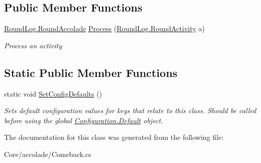 \subsection*{Public Member Functions}
\begin{DoxyCompactItemize}
\item 
\hypertarget{class_m_b_c_1_1_core_1_1mbc_1_1accolade_1_1_comeback_a805182b1fd3ffde85c1e2cb5c56bc25a}{\hyperlink{class_m_b_c_1_1_core_1_1_round_log_a4060830ca7135aa755ec5b6d24aa30e6}{Round\-Log.\-Round\-Accolade} \hyperlink{class_m_b_c_1_1_core_1_1mbc_1_1accolade_1_1_comeback_a805182b1fd3ffde85c1e2cb5c56bc25a}{Process} (\hyperlink{class_m_b_c_1_1_core_1_1_round_log_1_1_round_activity}{Round\-Log.\-Round\-Activity} a)}\label{class_m_b_c_1_1_core_1_1mbc_1_1accolade_1_1_comeback_a805182b1fd3ffde85c1e2cb5c56bc25a}

\begin{DoxyCompactList}\small\item\em Process an activity\end{DoxyCompactList}\end{DoxyCompactItemize}
\subsection*{Static Public Member Functions}
\begin{DoxyCompactItemize}
\item 
\hypertarget{class_m_b_c_1_1_core_1_1mbc_1_1accolade_1_1_comeback_ade0d2717481a475daa6f452de5090554}{static void \hyperlink{class_m_b_c_1_1_core_1_1mbc_1_1accolade_1_1_comeback_ade0d2717481a475daa6f452de5090554}{Set\-Config\-Defaults} ()}\label{class_m_b_c_1_1_core_1_1mbc_1_1accolade_1_1_comeback_ade0d2717481a475daa6f452de5090554}

\begin{DoxyCompactList}\small\item\em Sets default configuration values for keys that relate to this class. Should be called before using the global \hyperlink{class_m_b_c_1_1_core_1_1_configuration_a5db184730b6c51c2ae617d0fc1976c13}{Configuration.\-Default} object.\end{DoxyCompactList}\end{DoxyCompactItemize}


The documentation for this class was generated from the following file\-:\begin{DoxyCompactItemize}
\item 
Core/accolade/Comeback.\-cs\end{DoxyCompactItemize}
